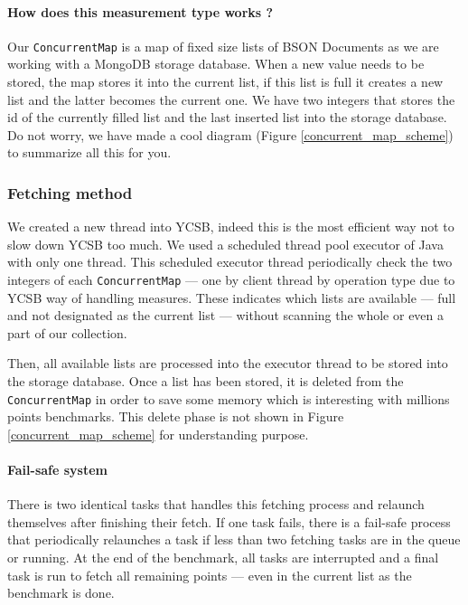 \documentclass[a4paper,11pt]{report}
\begin{document}
\paragraph{How does this measurement type works ?}  Our \texttt{ConcurrentMap} is a map of fixed size lists of BSON Documents as we are working with a MongoDB storage database. When a new value needs to be stored, the map stores it into the current list, if this list is full it creates a new list and the latter becomes the current one. We have two integers that stores the id of the currently filled list and the last inserted list into the storage database. Do not worry, we have made a cool diagram (Figure \ref{concurrent_map_scheme}) to summarize all this for you.

\subsubsection{Fetching method}

We created a new thread into YCSB, indeed this is the most efficient way not to slow down YCSB too much. We used a scheduled thread pool executor of Java with only one thread. This scheduled executor thread periodically check the two integers of each \texttt{ConcurrentMap} --- one by client thread by operation type due to YCSB way of handling measures. These indicates which lists are available --- full and not designated as the current list --- without scanning the whole or even a part of our collection. 

Then, all available lists are processed into the executor thread to be stored into the storage database. Once a list has been stored, it is deleted from the \texttt{ConcurrentMap} in order to save some memory which is interesting with millions points benchmarks. This delete phase is not shown in Figure \ref{concurrent_map_scheme} for understanding purpose.


\paragraph{Fail-safe system}

There is two identical tasks that handles this fetching process and relaunch themselves after finishing their fetch. If one task fails, there is a fail-safe process that periodically relaunches a task if less than two fetching tasks are in the queue or running. At the end of the benchmark, all tasks are interrupted and a final task is run to fetch all remaining points --- even in the current list as the benchmark is done.
\end{document}
